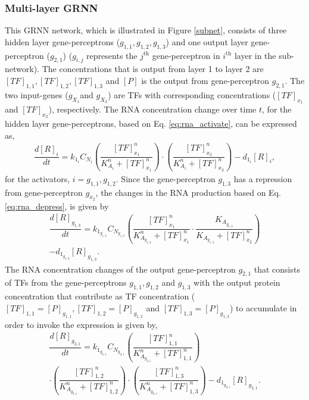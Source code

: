 \documentclass[twocolumn]{biophys-new}
\begin{document}
{{\subsubsection*{Multi-layer GRNN} \label{no_hidden}
This GRNN network, which is illustrated in Figure \ref{subnet}, consists of three hidden layer gene-perceptrons ($g_{1,1}, g_{1,2}, g_{1,3}$) and one output layer gene-perceptron ($g_{2,1}$) ($g_{i,j}$ represents the $j^{\text{th}}$ gene-perceptron in $i^{\text{th}}$ layer in the sub-network). The concentrations that is output from layer 1 to layer 2 are $[TF]_{1,1}, [TF]_{1,2}, [TF]_{1,3}$ and $[P]$ is the output from gene-perceptron $g_{2,1}$.
The two input-genes ($g_{X_1} $and $g_{X_2}$) are TFs  with corresponding concentrations ($[TF]_{x_1}$ and $[TF]_{x_2}$), respectively. The RNA  concentration change over time $t$, for the hidden layer gene-perceptrons, based on Eq. \ref{eq:rna_activate}, can be expressed as,
\vspace{-0.4em}
\begin{gather}
    \dfrac{d[R]_i}{dt} = k_{1_i} C_{N_i} \left( \dfrac{[TF]_{x_1}^n}{K_{A_i}^n+ [TF]_{x_1}^n} \right) 
    \cdot \left( \dfrac{[TF]_{x_2}^n}{K_{A_i}^n+ [TF]_{x_2}^n} \right) - d_{1_i} [R]_i, \label{eq:input_activate} 
\end{gather}
for the activators, $i= g_{1,1}, g_{1,2}$.
Since the gene-perceptron $g_{1,3}$ has a repression from gene-perceptron $g_{x_2}$, the changes in the RNA production based on Eq. \ref{eq:rna_depress},  is given by 
\vspace{-0.5em}
\begin{multline}
    \dfrac{d[R]_{g_{1,3}}}{dt} = k_{1_{g_{1,3}}} C_{N_{g_{1,3}}}  \left( \dfrac{[TF]_{x_1}^n}{K_{A_{g_{1,3}}}^n+ [TF]_{x_1}^n} \cdot \dfrac{K_{A_{g_{1,3}}}}{K_{A_{g_{1,3}}}+ [TF]_{x_2}^n}\right)\\ - d_{1_{g_{1,3}}} [R]_{g_{1,3}}.
    \label{eq:input_repress}
\end{multline}
The RNA concentration changes of the output gene-perceptron $g_{2,1}$
that consists of TFs from the gene-perceptrons $g_{1,1}, g_{1,2}$ and $g_{1,3}$ with the output protein concentration that contribute as TF concentration ($[TF]_{1,1}= [P]_{g_{1,1}}, [TF]_{1,2}= [P]_{g_{1,2}}$ and $[TF]_{1,3}= [P]_{g_{1,3}}$) to accumulate in order to invoke the expression is given by,
\vspace{-1em}
\begin{multline}
    \dfrac{d[R]_{g_{2,1}}}{dt} = k_{1_{g_{2,1}}} C_{N_{g_{2,1}}}  \left( \dfrac{[TF]_{1,1}^n}{K_{A_{g_{2,1}}}^n+ [TF]_{1,1}^n} \right) \\ \cdot 
      \left( \dfrac{[TF]_{1,2}^n}{K_{A_{g_{2,1}}}^n+ [TF]_{1,2}^n} \right)   \cdot \left( \dfrac{[TF]_{1,3}^n}{K_{A_{g_{2,1}}}^n+ [TF]_{1,3}^n} \right) 
    - d_{ 1_{g_{2,1}} } [R]_{g_{2,1}}.
    \label{eq:g2_1_equation}
\end{multline}

}}
\end{document}
